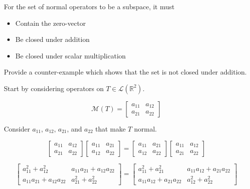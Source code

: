 \documentclass[fleqn]{article}
\begin{document}
\begin{enumerate}[nolistsep]
		For the set of normal operators to be a subspace, it must
		
		\begin{itemize}
			\item Contain the zero-vector
			\item Be closed under addition
			\item Be closed under scalar multiplication	
		\end{itemize}
		
		Provide a counter-example which shows that the set is not closed under addition.
		
		Start by considering operators on $T \in \mathcal{L}(\mathbb{R}^2)$.
		
		\begin{equation*}
			\mathcal{M}(T) = \begin{bmatrix}
				a_{11} & a_{12} \\
				a_{21} & a_{22}
			\end{bmatrix}
		\end{equation*}
		
		Consider $a_{11}$, $a_{12}$, $a_{21}$, and $a_{22}$ that make $T$ normal.
		
		\begin{equation*}
			\begin{bmatrix}
				a_{11} & a_{12} \\
				a_{21} & a_{22}
			\end{bmatrix}\begin{bmatrix}
				a_{11} & a_{21} \\
				a_{12} & a_{22}
			\end{bmatrix} = \begin{bmatrix}
				a_{11} & a_{21} \\
				a_{12} & a_{22}
			\end{bmatrix}\begin{bmatrix}
				a_{11} & a_{12} \\
				a_{21} & a_{22}
			\end{bmatrix}
		\end{equation*} 
		
		\begin{equation*}
			\begin{bmatrix}
				a_{11}^2 + a_{12}^2 & a_{11}a_{21} + a_{12}a_{22} \\
				a_{11}a_{21} + a_{12}a_{22} & a_{21}^2 + a_{22}^2
			\end{bmatrix} = \begin{bmatrix}
				a_{11}^2 + a_{21}^2 & a_{11}a_{12} + a_{21}a_{22} \\
				a_{11}a_{12} + a_{21}a_{22} & a_{12}^2 + a_{22}^2
			\end{bmatrix}
		\end{equation*}
		

\end{enumerate}
\end{document}
